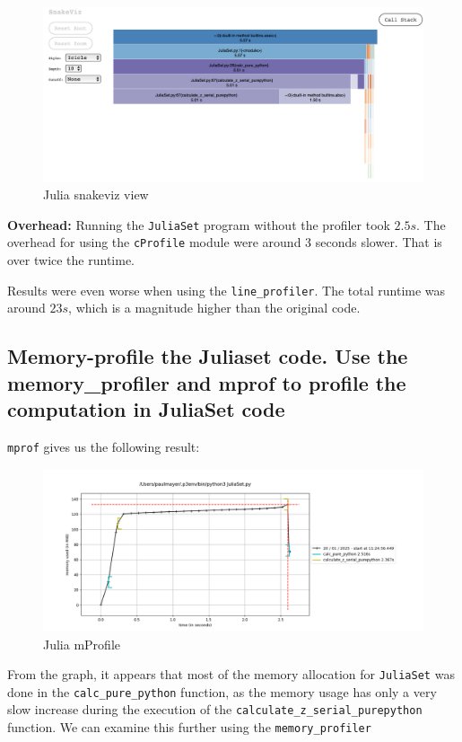 \documentclass[a4paper,12pt]{article}
\begin{document}
\begin{figure}[h!]
  \centering
  \includegraphics[width=\textwidth]{images/julia_snakeviz_view}
  \caption{Julia snakeviz view}
  \label{fig:julia-snakeviz}
\end{figure}

\textbf{Overhead:}
Running the \verb|JuliaSet| program without the profiler took $2.5 s$.
The overhead for using the \verb|cProfile| module were around 3 seconds slower.
That is over twice the runtime.

Results were even worse when using the \verb|line_profiler|.
The total runtime was around $23 s$, which is a magnitude higher than the original code.

\subsection{Memory-profile the Juliaset code. Use the memory\_profiler and mprof to profile the computation in JuliaSet code}

\verb|mprof| gives us the following result:
\begin{figure}[h!]
  \centering
  \includegraphics[width=\textwidth]{images/julia_mprofile}
  \caption{Julia mProfile}
  \label{fig:julia-mprofile}
\end{figure}

From the graph, it appears that most of the memory allocation for \verb|JuliaSet| was done in the \verb|calc_pure_python| function, as the memory usage has only a very slow increase during the execution of the \verb|calculate_z_serial_purepython| function. We can examine this further using the \verb|memory_profiler| \\
\end{document}
